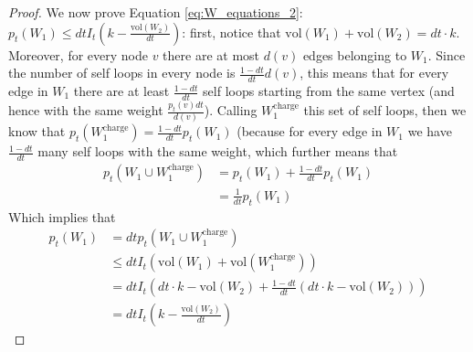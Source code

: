 \documentclass[../main.tex]{subfiles}
\begin{document}
\begin{proof}
    We now prove Equation \ref{eq:W_equations_2}: $p_t(W_1) \leq dt I_t\left(k - \frac{\text{vol}(W_2)}{dt}\right)$: first, notice that $\text{vol}(W_1) + \text{vol}(W_2) = dt \cdot k$. Moreover, for every node $v$ there are at most $d(v)$ edges belonging to $W_1$. Since the number of self loops in every node is $\frac{1-dt}{dt}d(v)$, this means that for every edge in $W_1$ there are at least $\frac{1-dt}{dt}$ self loops starting from the same vertex (and hence with the same weight $\frac{p_t(v)dt}{d(v)}$). Calling $W_1^{\text{charge}}$ this set of self loops, then we know that $p_t(W_1^{\text{charge}}) = \frac{1-dt}{dt}p_t(W_1)$ (because for every edge in $W_1$ we have $\frac{1-dt}{dt}$ many self loops with the same weight, which further means that 
    \begin{align}
        p_t(W_1 \cup W_1^{\text{charge}}) & = p_t(W_1) + \frac{1 - dt}{dt} p_t(W_1) \\
        & = \frac{1}{dt} p_t(W_1)
    \end{align}
    Which implies that 
    \begin{align}
        p_t(W_1) & = dt p_t(W_1 \cup W_1^{\text{charge}}) \\
        & \leq dt I_t(\text{vol}(W_1) + \text{vol}(W_1^{\text{charge}})) \\
        & = dt I_t(dt \cdot k - \text{vol}(W_2) + \frac{1-dt}{dt}(dt \cdot k - \text{vol}(W_2))) \\
        & = dt I_t\left(k - \frac{\text{vol}(W_2)}{dt}\right)
    \end{align}
    

\end{proof}
\end{document}
